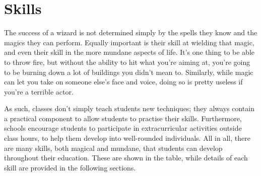 \chapter{Skills}

The success of a wizard is not determined simply by the spells they know and the magics they can perform.
Equally important is their skill at wielding that magic, and even their skill in the more mundane aspects of life.
It's one thing to be able to throw fire, but without the ability to hit what you're aiming at, you're going to be burning down a lot of buildings you didn't mean to.
Similarly, while magic can let you take on someone else's face and voice, doing so is pretty useless if you're a terrible actor.

As such, classes don't simply teach students new techniques; they always contain a practical component to allow students to practise their skills.
Furthermore, schools encourage students to participate in extracurricular activities outside class hours, to help them develop into well-rounded individuals.
All in all, there are many skills, both magical and mundane, that students can develop throughout their education.
These are shown in the  table, while details of each skill are provided in the following sections.


